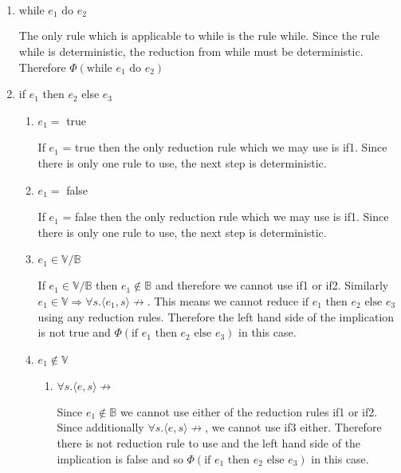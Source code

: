 \documentclass[10pt,\jkfside,a4paper]{article}
\begin{document}
\begin{enumerate}
\begin{enumerate}[label=\textbf{Case}]
\fi

\item $\text{while } e_1 \text{ do } e_2$

The only rule which is applicable to while is the rule while. Since the rule
while is deterministic, the reduction from while must be deterministic.
Therefore $\Phi(\text{while } e_1 \text{ do } e_2)$

\iffalse

\item if $e_1$ then $e_2$ else $e_3$

\begin{enumerate}[label=\textbf{Case}]

\item $e_1 =$ true

If $e_1$ = true then the only reduction rule which we may use is if1. Since
there is only one rule to use, the next step is deterministic.

\item $e_1 =$ false

If $e_1$ = false then the only reduction rule which we may use is if1. Since
there is only one rule to use, the next step is deterministic.

\item $e_1 \in \mathbb{V} / \mathbb{B}$

If $e_1 \in \mathbb{V} / \mathbb{B}$ then $e_1 \notin \mathbb{B}$ and
therefore we cannot use if1 or if2. Similarly $e_1 \in \mathbb{V}
\Longrightarrow \forall s. \langle e_1, s \rangle \not\to $. This means we
cannot reduce $\text{if }e_1 \text{ then } e_2 \text{ else } e_3$ using any
reduction rules. Therefore the left hand side of the implication is not true
and $\Phi(\text{if }e_1 \text{ then } e_2 \text{ else } e_3)$ in this case.

\item $e_1 \notin \mathbb{V}$

\begin{enumerate}[label=\textbf{Case}]

\item $\forall s. \langle e, s \rangle \not\to $

Since $e_1 \notin \mathbb{B}$ we cannot use either of the reduction rules if1
or if2. Since additionally $\forall s. \langle e, s \rangle \not\to$, we
cannot use if3 either. Therefore there is not reduction rule to use and the
left hand side of the implication is false and so $\Phi(\text{if } e_1
\text{ then } e_2 \text{ else } e_3)$ in this case.


\end{enumerate}
\end{enumerate}
\end{enumerate}
\end{enumerate}
\end{document}
